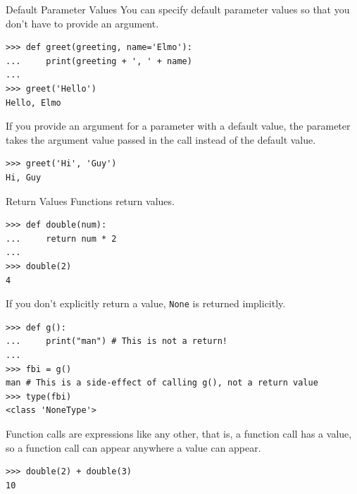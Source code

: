 \documentclass[smaller, aspectratio=1610]{beamer}
\begin{document}
\begin{frame}[label={sec:orgda29960},fragile]{Default Parameter Values}
 You can specify default parameter values so that you don't have to provide an argument.

\lstset{language=Python,label= ,caption= ,captionpos=b,numbers=none}
\begin{lstlisting}
>>> def greet(greeting, name='Elmo'):
...     print(greeting + ', ' + name)
...
>>> greet('Hello')
Hello, Elmo
\end{lstlisting}

If you provide an argument for a parameter with a default value, the parameter takes the argument value passed in the call instead of the default value.

\lstset{language=Python,label= ,caption= ,captionpos=b,numbers=none}
\begin{lstlisting}
>>> greet('Hi', 'Guy')
Hi, Guy
\end{lstlisting}
\end{frame}

\begin{frame}[label={sec:org7e2085e},fragile]{Return Values}
 Functions return values.

\lstset{language=Python,label= ,caption= ,captionpos=b,numbers=none}
\begin{lstlisting}
>>> def double(num):
...     return num * 2
...
>>> double(2)
4
\end{lstlisting}

If you don't explicitly return a value, \texttt{None} is returned implicitly.

\lstset{language=Python,label= ,caption= ,captionpos=b,numbers=none}
\begin{lstlisting}
>>> def g():
...     print("man") # This is not a return!
...
>>> fbi = g()
man # This is a side-effect of calling g(), not a return value
>>> type(fbi)
<class 'NoneType'>
\end{lstlisting}

Function calls are expressions like any other, that is, a function call has a value, so a function call can appear anywhere a value can appear.

\lstset{language=Python,label= ,caption= ,captionpos=b,numbers=none}
\begin{lstlisting}
>>> double(2) + double(3)
10
\end{lstlisting}
\end{frame}
\end{document}
